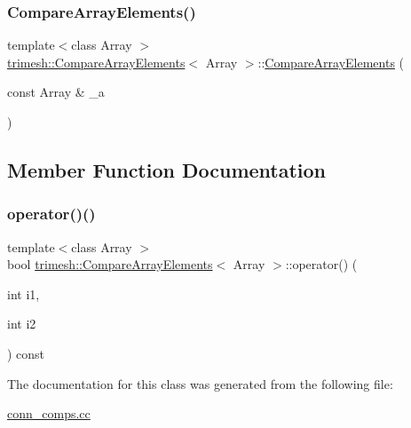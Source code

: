 \subsubsection{\texorpdfstring{Compare\+Array\+Elements()}{CompareArrayElements()}}
{\footnotesize\ttfamily template$<$class Array $>$ \\
\hyperlink{classtrimesh_1_1CompareArrayElements}{trimesh\+::\+Compare\+Array\+Elements}$<$ Array $>$\+::\hyperlink{classtrimesh_1_1CompareArrayElements}{Compare\+Array\+Elements} (\begin{DoxyParamCaption}\item[{const Array \&}]{\+\_\+a }\end{DoxyParamCaption})\hspace{0.3cm}{\ttfamily [inline]}}



\subsection{Member Function Documentation}
\mbox{\label{classtrimesh_1_1CompareArrayElements_aba402709a16256f1b8a519996eacfc79}} 
\subsubsection{\texorpdfstring{operator()()}{operator()()}}
{\footnotesize\ttfamily template$<$class Array $>$ \\
bool \hyperlink{classtrimesh_1_1CompareArrayElements}{trimesh\+::\+Compare\+Array\+Elements}$<$ Array $>$\+::operator() (\begin{DoxyParamCaption}\item[{int}]{i1,  }\item[{int}]{i2 }\end{DoxyParamCaption}) const\hspace{0.3cm}{\ttfamily [inline]}}



The documentation for this class was generated from the following file\+:\begin{DoxyCompactItemize}
\item 
\hyperlink{conn__comps_8cc}{conn\+\_\+comps.\+cc}\end{DoxyCompactItemize}
